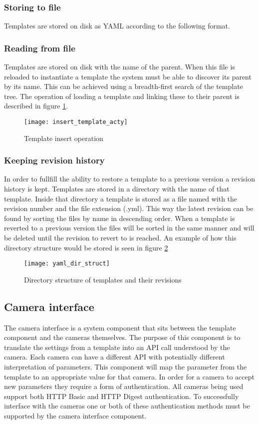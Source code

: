 \subsubsection{Storing to file}
Templates are stored on disk as YAML according to the following format.


\subsubsection{Reading from file}
Templates are stored on disk with the name of the parent. When this file is reloaded to instantiate a template the system must be able to discover its
parent by its name. This can be achieved using a breadth-first search of the template tree.
The operation of loading a template and linking these to their parent is described in figure \ref{fig:inserttemplate}.

\begin{figure}[h!]
	\centering
	\texttt{[image: insert\_template\_acty]}
	\caption{Template insert operation}
	\label{fig:inserttemplate}
\end{figure}

\subsubsection{Keeping revision history}
In order to fullfill the ability to restore a template to a previous version a revision history is kept.
Templates are stored in a directory with the name of that template.
Inside that directory a template is stored as a file named with the revision number and the file extension (.yml).
This way the latest revision can be found by sorting the files by name in descending order.
When a template is reverted to a previous version the files will be sorted in the same manner and will be deleted until the revision to revert to is reached. An example of how this directory structure would be stored is seen in figure \ref{fig:diskstruct}

\begin{figure}[h!]
	\centering
	\texttt{[image: yaml\_dir\_struct]}
	\caption{Directory structure of templates and their revisions}
	\label{fig:diskstruct}
\end{figure}

\subsection{Camera interface}
The camera interface is a system component that sits between the template component and the cameras themselves. The purpose of this component
is to translate the settings from a template into an API call understood by the camera. Each camera can have a different API with potentially different interpretation of parameters. This component will map the parameter from the template to an appropriate value for that camera.
In order for a camera to accept new parameters they require a form of authentication. All cameras being used support both HTTP Basic and HTTP Digest authentication.
To successfully interface with the cameras one or both of these authentication methods must be supported by the camera interface component.

